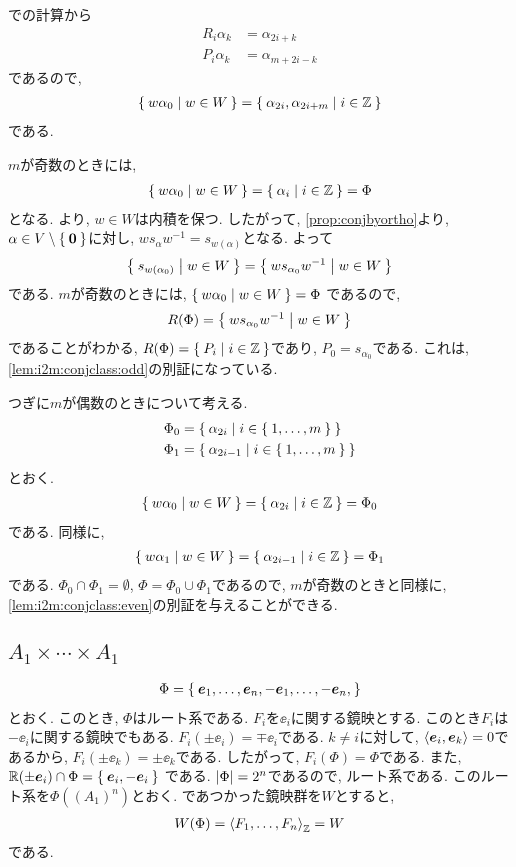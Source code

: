 での計算から
\begin{align*}
  R_i\alpha_k& =\alpha_{2i+k}\\
  P_i\alpha_k&=\alpha_{m+2i-k}
\end{align*}
であるので,
\begin{align*}
\Set{w\alpha_0 | w\in W} = \Set{\alpha_{2i}, \alpha_{2i+m}| i \in \mathbb{Z}}
\end{align*}
である.

$m$が奇数のときには,
\begin{align*}
\Set{w\alpha_0 | w\in W} = \Set{\alpha_{i}| i \in \mathbb{Z}}=\Phi
\end{align*}
となる.
より, $w\in W$は内積を保つ.
したがって, \cref{prop:conjbyortho}より,
  $\alpha\in V\setminus\Set{\boldsymbol{0}}$に対し,
$ws_\alpha w^{-1}=s_{w(\alpha)}$となる.
よって
\begin{align*}
\Set{s_{w(\alpha_0)}|w\in W}=\Set{ws_{\alpha_0} w^{-1}|w\in W}
\end{align*}
である.
$m$が奇数のときには,
$\Set{w\alpha_0 | w\in W}=\Phi$
であるので,
\begin{align*}
  R(\Phi)=\Set{ws_{\alpha_0} w^{-1}|w\in W}
\end{align*}
であることがわかる, $R(\Phi)=\Set{P_i|i\in \mathbb{Z}}$であり,
$P_0=s_{\alpha_0}$である.
これは, \cref{lem:i2m:conjclass:odd}の別証になっている.

つぎに$m$が偶数のときについて考える.
\begin{align*}
\Phi_0&=\Set{\alpha_{2i}| i \in \Set{1,\ldots,m}}\\
\Phi_1&=\Set{\alpha_{2i-1}| i \in \Set{1,\ldots,m}}\\
\end{align*}
とおく.
\begin{align*}
 \Set{w\alpha_0 | w\in W}
  = \Set{\alpha_{2i}| i \in \mathbb{Z}}=\Phi_0
\end{align*}
である.
同様に,
\begin{align*}
\Set{w\alpha_1 | w\in W}
  = \Set{\alpha_{2i-1}| i \in \mathbb{Z}}=\Phi_1
\end{align*}
である. $\Phi_0\cap \Phi_1=\emptyset$, $\Phi=\Phi_0\cup \Phi_1$であるので,
$m$が奇数のときと同様に,
\cref{lem:i2m:conjclass:even}の別証を与えることができる.

\subsection{$A_{1}\times\cdots\times A_{1}$}
\label{ex:a1n:root}
\begin{align*}
\Phi=\Set{\boldsymbol{e}_1,\ldots,\boldsymbol{e}_n,-\boldsymbol{e}_1,\ldots,-\boldsymbol{e}_n,}
\end{align*}
とおく.  このとき,
$\Phi$はルート系である.
$F_i$を$\ee_i$に関する鏡映とする.
このとき$F_i$は$-\ee_i$に関する鏡映でもある.
$F_i(\pm\ee_i)=\mp\ee_i$である. 
$k\neq i$に対して, $\Braket{\boldsymbol{e}_i,\boldsymbol{e}_k}=0$であるから,
$F_i(\pm\ee_k)=\pm\ee_k$である.
したがって, $F_i(\Phi)=\Phi$である.
また, $\mathbb{R}(\pm\boldsymbol{e}_i)\cap \Phi=\Set{\boldsymbol{e}_i,-\boldsymbol{e}_i}$
である.
$\left|\Phi\right|=2^n$であるので, ルート系である.
このルート系を$\Phi((A_{1})^n)$とおく.
であつかった鏡映群を$W$とすると,
\begin{align*}
  W(\Phi)=\Braket{F_1,\ldots,F_n}_{\mathbb{Z}}=W
\end{align*}
である.

